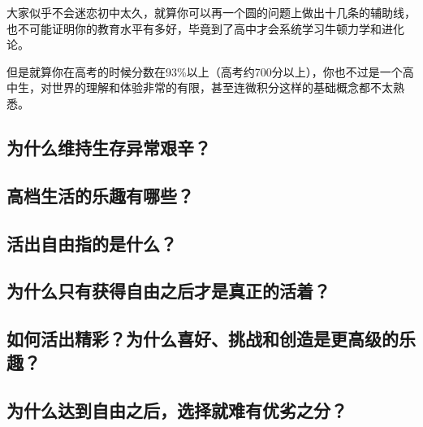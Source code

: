 大家似乎不会迷恋初中太久，就算你可以再一个圆的问题上做出十几条的辅助线，也不可能证明你的教育水平有多好，毕竟到了高中才会系统学习牛顿力学和进化论。

但是就算你在高考的时候分数在93\%以上（高考约700分以上），你也不过是一个高中生，对世界的理解和体验非常的有限，甚至连微积分这样的基础概念都不太熟悉。

\subsection{为什么维持生存异常艰辛？}
\subsection{高档生活的乐趣有哪些？}
\subsection{活出自由指的是什么？}
\subsection{为什么只有获得自由之后才是真正的活着？}
\subsection{如何活出精彩？为什么喜好、挑战和创造是更高级的乐趣？}
\subsection{为什么达到自由之后，选择就难有优劣之分？}
